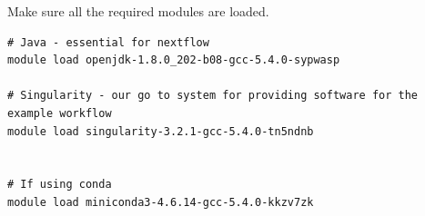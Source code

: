 Make sure all the required modules are loaded. 

\begin{steps}
\begin{lstlisting}
# Java - essential for nextflow
module load openjdk-1.8.0_202-b08-gcc-5.4.0-sypwasp 

# Singularity - our go to system for providing software for the example workflow
module load singularity-3.2.1-gcc-5.4.0-tn5ndnb


# If using conda 
module load miniconda3-4.6.14-gcc-5.4.0-kkzv7zk
\end{lstlisting}
\end{steps}




